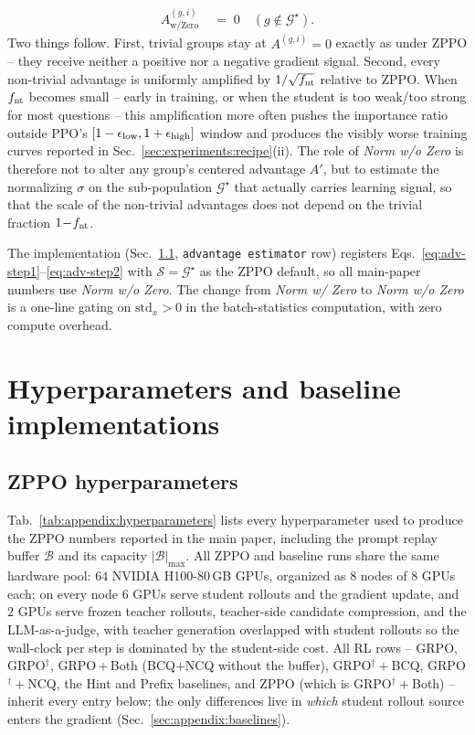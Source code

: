 \documentclass{llmxive}
\begin{document}
\begin{itemize}[leftmargin=12pt,topsep=2pt,itemsep=2pt]
\begin{align}
  A^{(g,i)}_{\text{w/Zero}}
    &\;=\; 0 \quad (g\notin\mathcal{G}^{\star}).
  \label{eq:wzero-amplify}
  \end{align}
  Two things follow. First, trivial groups stay at $A^{(g,i)}\!=\!0$ exactly as under ZPPO -- they receive neither a positive nor a negative gradient signal. Second, every non-trivial advantage is uniformly amplified by $1/\sqrt{f_{\rm nt}}$ relative to ZPPO. When $f_{\rm nt}$ becomes small -- early in training, or when the student is too weak/too strong for most questions -- this amplification more often pushes the importance ratio outside PPO's $[1-\epsilon_{\rm low},1+\epsilon_{\rm high}]$ window and produces the visibly worse training curves reported in Sec.~\ref{sec:experiments:recipe}(ii). The role of \emph{Norm w/o Zero} is therefore not to alter any group's centered advantage $A'$, but to estimate the normalizing $\sigma$ on the sub-population $\mathcal{G}^{\star}$ that actually carries learning signal, so that the scale of the non-trivial advantages does not depend on the trivial fraction $1\!-\!f_{\rm nt}$.
\end{itemize}
The implementation (Sec.~\ref{sec:appendix:hyperparameters:zppo}, \texttt{advantage estimator} row) registers Eqs.~\eqref{eq:adv-step1}--\eqref{eq:adv-step2} with $\mathcal{S}\!=\!\mathcal{G}^{\star}$ as the ZPPO default, so all main-paper numbers use \emph{Norm w/o Zero}. The change from \emph{Norm w/ Zero} to \emph{Norm w/o Zero} is a one-line gating on $\mathrm{std}_x\!>\!0$ in the batch-statistics computation, with zero compute overhead.


\section{Hyperparameters and baseline implementations}
\label{sec:appendix:hyperparameters}

\subsection{ZPPO hyperparameters}
\label{sec:appendix:hyperparameters:zppo}

Tab.~\ref{tab:appendix:hyperparameters} lists every hyperparameter used to produce the ZPPO numbers reported in the main paper, including the prompt replay buffer $\mathcal{B}$ and its capacity $|\mathcal{B}|_{\max}$. All ZPPO and baseline runs share the same hardware pool: $64$ NVIDIA H100-$80$\,GB GPUs, organized as $8$ nodes of $8$ GPUs each; on every node $6$ GPUs serve student rollouts and the gradient update, and $2$ GPUs serve frozen teacher rollouts, teacher-side candidate compression, and the LLM-as-a-judge, with teacher generation overlapped with student rollouts so the wall-clock per step is dominated by the student-side cost. All RL rows -- GRPO, GRPO$^{\dagger}$, GRPO\,$+$\,Both (BCQ$+$NCQ without the buffer), GRPO$^{\dagger}\!+\!$BCQ, GRPO$^{\dagger}\!+\!$NCQ, the Hint and Prefix baselines, and ZPPO (which is GRPO$^{\dagger}\!+\!$Both) -- inherit every entry below; the only differences live in \emph{which} student rollout source enters the gradient (Sec.~\ref{sec:appendix:baselines}).
\end{document}
